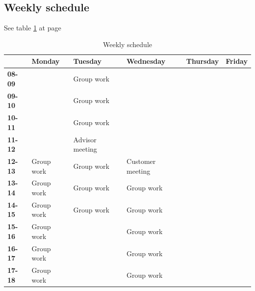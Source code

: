 \subsection{Weekly schedule}
See table \ref{tab:weeklyschedule} at page \pageref{tab:weeklyschedule}
\begin{table}
\begin{tabular}{l|l|l|l|l|l} \hline
 & \textbf{Monday} & \textbf{Tuesday} & \textbf{Wednesday} & \textbf{Thursday} & \textbf{Friday} \\ \hline \hline
\textbf{08-09} &  & Group work &  &  &  \\
\textbf{09-10} &  & Group work &  &  &  \\
\textbf{10-11} &  & Group work &  &  &  \\
\textbf{11-12} &  & Advisor meeting & &  &  \\
\textbf{12-13} & Group work & Group work & Customer meeting &  &  \\
\textbf{13-14} & Group work & Group work & Group work &  &  \\
\textbf{14-15} & Group work & Group work & Group work &  &  \\
\textbf{15-16} & Group work &  & Group work &  &  \\
\textbf{16-17} & Group work &  & Group work &  &  \\
\textbf{17-18} & Group work &  & Group work &  & \\ \hline
\end{tabular}
\caption {Weekly schedule} \label{tab:weeklyschedule}
\end{table}

